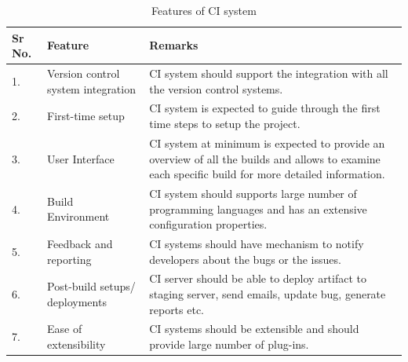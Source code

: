 \documentclass[10pt]{ruthesis}
\begin{document}
\begin{table}
\begin{center}
\def\arraystretch{2}
\begin{tabular}{|p{1.5cm}|p{5cm}|p{8.5cm}|}
\hline
\rule{0pt}{15pt} \textbf{Sr No.} & \textbf{Feature} & \textbf{Remarks} \\[2ex]
\hline
1. & Version control system integration & CI system should support the integration with all the version control systems. \\
\hline

2. & First-time setup & CI system is expected to guide through the first time steps to setup the project.\\
\hline

3. & User Interface & CI system at minimum is expected to provide an overview of all the builds and allows to examine each specific build for more detailed information. \\
\hline

4. & Build Environment & CI system should supports large number of programming languages and has an extensive configuration properties. \\
\hline

5. & Feedback and reporting & CI systems should have mechanism to notify developers about the bugs or the issues.\\
\hline

6. & Post-build setups/ deployments & CI server should be able to deploy artifact to staging server, send emails, update bug, generate reports etc.\\
\hline

7. & Ease of extensibility & CI systems should be extensible and should provide large number of plug-ins.\\
\hline
\end{tabular}
\end{center}
\caption{Features of CI system}
\label{feature}
\end{table}
\end{document}
